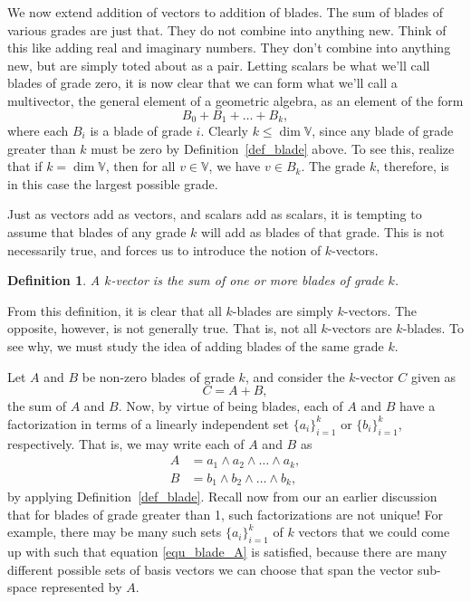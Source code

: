 \documentclass[12pt]{article}
\newcommand{\V}{\mathbb{V}}
\newtheorem{definition}{Definition}[section]
\begin{document}
We now extend addition of vectors to addition of blades.  The sum of blades
of various grades are just that.  They do not combine into anything new.
Think of this like adding real and imaginary numbers.  They don't combine
into anything new, but are simply toted about as a pair.  Letting scalars
be what we'll call blades of grade zero, it is now clear that we can form
what we'll call a multivector, the general element of a geometric algebra,
as an element of the form
\begin{equation}
B_0 + B_1 + \dots + B_k,
\end{equation}
where each $B_i$ is a blade of grade $i$.  Clearly $k\leq\dim\V$, since
any blade of grade greater than $k$ must be zero by Definition~\ref{def_blade} above.
To see this, realize that if $k=\dim\V$, then for all $v\in\V$, we have $v\in B_k$.  The
grade $k$, therefore, is in this case the largest possible grade.

Just as vectors add as vectors, and scalars add as scalars, it is tempting to assume
that blades of any grade $k$ will add as blades of that grade.  This is not necessarily true,
and forces us to introduce the notion of $k$-vectors.
\begin{definition}
A $k$-vector is the sum of one or more blades of grade $k$.
\end{definition}
From this definition, it is clear that all $k$-blades are simply $k$-vectors.
The opposite, however, is not generally true.  That is, not all $k$-vectors are
$k$-blades.  To see why, we must study the idea of adding blades of the
same grade $k$.

Let $A$ and $B$ be non-zero blades of grade $k$, and consider the $k$-vector
$C$ given as
\begin{equation}
C = A + B,
\end{equation}
the sum of $A$ and $B$.  Now, by virtue of being blades, each of
$A$ and $B$ have a factorization in terms of a
linearly independent set $\{a_i\}_{i=1}^k$ or $\{b_i\}_{i=1}^k$,
respectively.  That is, we may write each of $A$ and $B$ as
\begin{align}
A &= a_1\wedge a_2\wedge\dots\wedge a_k, \label{equ_blade_A}\\
B &= b_1\wedge b_2\wedge\dots\wedge b_k,\label{equ_blade_B}
\end{align}
by applying Definition~\ref{def_blade}.
Recall now from our an earlier discussion that for blades of grade greater than 1,
such factorizations are not unique!
For example, there may be many such sets $\{a_i\}_{i=1}^k$ of $k$ vectors
that we could come up with such that equation \eqref{equ_blade_A} is satisfied,
because there are many different possible sets of basis vectors we can choose that
span the vector sub-space represented by $A$.
\end{document}
